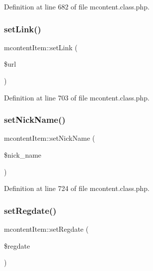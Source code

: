 Definition at line 682 of file mcontent.\+class.\+php.

\hypertarget{classmcontentItem_a6c192aee58d7bca3d8933d387309b2ab}{}\label{classmcontentItem_a6c192aee58d7bca3d8933d387309b2ab} 
\subsubsection{\texorpdfstring{set\+Link()}{setLink()}}
{\footnotesize\ttfamily mcontent\+Item\+::set\+Link (\begin{DoxyParamCaption}\item[{}]{\$url }\end{DoxyParamCaption})}



Definition at line 703 of file mcontent.\+class.\+php.

\hypertarget{classmcontentItem_a4b702963538643aac56d9a3312a06bee}{}\label{classmcontentItem_a4b702963538643aac56d9a3312a06bee} 
\subsubsection{\texorpdfstring{set\+Nick\+Name()}{setNickName()}}
{\footnotesize\ttfamily mcontent\+Item\+::set\+Nick\+Name (\begin{DoxyParamCaption}\item[{}]{\$nick\+\_\+name }\end{DoxyParamCaption})}



Definition at line 724 of file mcontent.\+class.\+php.

\hypertarget{classmcontentItem_aeb646f2283bfb0a13b7d9f544058f962}{}\label{classmcontentItem_aeb646f2283bfb0a13b7d9f544058f962} 
\subsubsection{\texorpdfstring{set\+Regdate()}{setRegdate()}}
{\footnotesize\ttfamily mcontent\+Item\+::set\+Regdate (\begin{DoxyParamCaption}\item[{}]{\$regdate }\end{DoxyParamCaption})}



